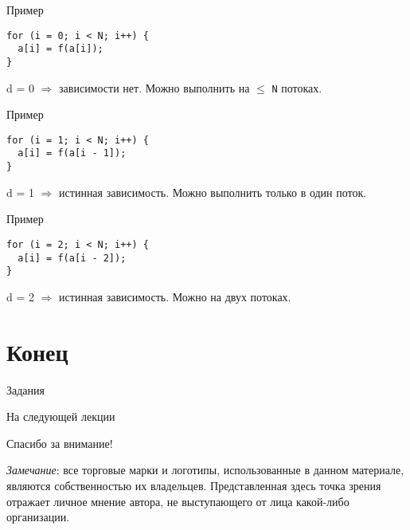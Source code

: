 \begin{frame}[fragile]{Пример}

\begin{lstlisting}
for (i = 0; i < N; i++) {
  a[i] = f(a[i]);
}
\end{lstlisting}

\pause\bigskip

d = 0 $\Rightarrow$ зависимости нет. Можно выполнить на $\leq$ \texttt{N} потоках.
\end{frame}

\begin{frame}[fragile]{Пример}
\begin{lstlisting}
for (i = 1; i < N; i++) {
  a[i] = f(a[i - 1]);
}
\end{lstlisting}

\pause\bigskip

d = 1 $\Rightarrow$ истинная зависимость. Можно выполнить только в один поток.
\end{frame}

\begin{frame}[fragile]{Пример}
\begin{lstlisting}
for (i = 2; i < N; i++) {
  a[i] = f(a[i - 2]);
}
\end{lstlisting}

\pause\bigskip

d = 2 $\Rightarrow$ истинная зависимость. Можно на двух потоках.
\end{frame}

\section*{Конец}

\begin{frame}{Задания}
\end{frame}

\begin{frame}{На следующей лекции}
\end{frame}

\begin{frame}

{\huge{Спасибо за внимание!}\par}

\vfill

\tiny{\textit{Замечание}: все торговые марки и логотипы, использованные в данном материале, являются собственностью их владельцев. Представленная здесь точка зрения отражает личное мнение автора, не выступающего от лица какой-либо организации.}

\end{frame}


